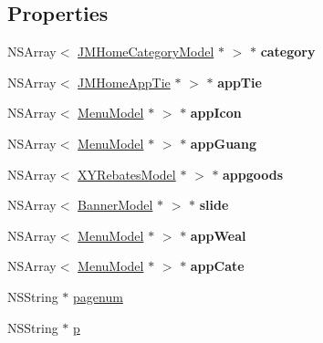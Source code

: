 \subsection*{Properties}
\begin{DoxyCompactItemize}
\item 
\mbox{\label{interface_j_m_home_model_a54bea26bf20996bf8737a29ee956e097}} 
N\+S\+Array$<$ \mbox{\hyperlink{interface_j_m_home_category_model}{J\+M\+Home\+Category\+Model}} $\ast$ $>$ $\ast$ {\bfseries category}
\item 
\mbox{\label{interface_j_m_home_model_ad656c723855f7f85fea9c973953efb58}} 
N\+S\+Array$<$ \mbox{\hyperlink{interface_j_m_home_app_tie}{J\+M\+Home\+App\+Tie}} $\ast$ $>$ $\ast$ {\bfseries app\+Tie}
\item 
\mbox{\label{interface_j_m_home_model_aaf0b97b10000a5e2a6d1b616a2a97ad3}} 
N\+S\+Array$<$ \mbox{\hyperlink{interface_menu_model}{Menu\+Model}} $\ast$ $>$ $\ast$ {\bfseries app\+Icon}
\item 
\mbox{\label{interface_j_m_home_model_a864e4b633cbc1ee77e8cdb8836056a15}} 
N\+S\+Array$<$ \mbox{\hyperlink{interface_menu_model}{Menu\+Model}} $\ast$ $>$ $\ast$ {\bfseries app\+Guang}
\item 
\mbox{\label{interface_j_m_home_model_a69625fca52371c4b6110e916bb9012f2}} 
N\+S\+Array$<$ \mbox{\hyperlink{interface_x_y_rebates_model}{X\+Y\+Rebates\+Model}} $\ast$ $>$ $\ast$ {\bfseries appgoods}
\item 
\mbox{\label{interface_j_m_home_model_a9792e2e691cf5e3b1ee45396c493cf48}} 
N\+S\+Array$<$ \mbox{\hyperlink{interface_banner_model}{Banner\+Model}} $\ast$ $>$ $\ast$ {\bfseries slide}
\item 
\mbox{\label{interface_j_m_home_model_a742302c34a35decb91f2c318e8a6e55e}} 
N\+S\+Array$<$ \mbox{\hyperlink{interface_menu_model}{Menu\+Model}} $\ast$ $>$ $\ast$ {\bfseries app\+Weal}
\item 
\mbox{\label{interface_j_m_home_model_a5a49a95691ea8b042dbe32ae36867317}} 
N\+S\+Array$<$ \mbox{\hyperlink{interface_menu_model}{Menu\+Model}} $\ast$ $>$ $\ast$ {\bfseries app\+Cate}
\item 
N\+S\+String $\ast$ \mbox{\hyperlink{interface_j_m_home_model_a04a1d641585dea8183d3591b5eec7765}{pagenum}}
\item 
N\+S\+String $\ast$ \mbox{\hyperlink{interface_j_m_home_model_aaae2bcc132f99e39ab5ba76fc3125968}{p}}
\end{DoxyCompactItemize}


